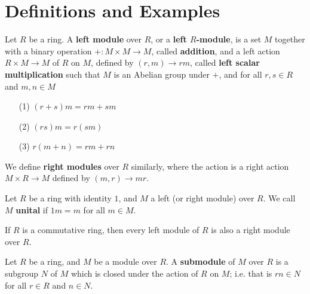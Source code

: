 \section{Definitions and Examples}

\begin{definition}
    Let $R$ be a ring. A  \textbf{left module} over $R$, or a  \textbf{left
    $R$-module}, is a set $M$ together with a binary operation  $+:M \times M
    \xrightarrow{} M$, called \textbf{addition}, and a left action $R \times M
    \xrightarrow{} M$ of $R$ on $M$, defined by $(r,m) \xrightarrow{} rm$,
    called  \textbf{left scalar multiplication} such that $M$ is an Abelian group
    under $+$, and for all $r,s \in R$ and $m,n \in M$
    \begin{enumerate}
        \item[(1)] $(r+s)m=rm+sm$

        \item[(2)] $(rs)m=r(sm)$

        \item[(3)] $r(m+n)=rm+rn$
    \end{enumerate}
    We define \textbf{right modules} over $R$ similarly, where the action is a
    right action $M \times R \xrightarrow{} M$ defined by $(m,r) \xrightarrow{}
    mr$.
\end{definition}

\begin{definition}
    Let $R$ be a ring with identity  $1$, and  $M$ a left  (or right module)
    over $R$. We call  $M$  \textbf{unital} if $1m=m$ for all  $m \in M$.
\end{definition}

\begin{lemma}\label{4.1.1}
    If $R$ is a commutative ring, then every left module of $R$ is also a right
    module over $R$.
\end{lemma}

\begin{definition}
    Let $R$ be a ring, and $M$ be a module over $R$. A \textbf{submodule} of $M$
    over  $R$ is a subgroup $N$ of $M$ which is closed under the action of  $R$
    on $M$; i.e. that is $rn \in N$ for all  $r \in R$ and  $n \in N$.
\end{definition}

